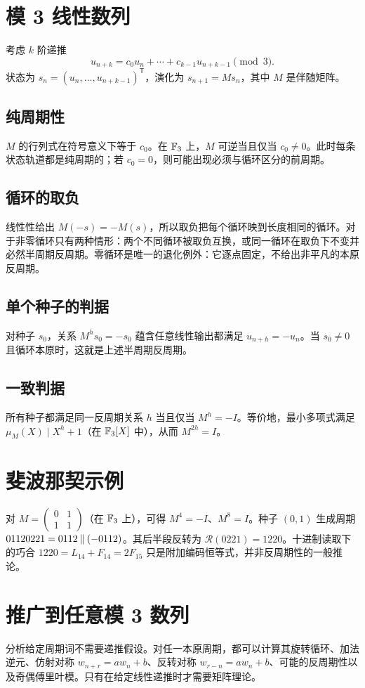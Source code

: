 \documentclass[11pt,a4paper]{article}
\begin{document}
\section{模 3 线性数列}
考虑 \(k\) 阶递推 \[u_{n+k}=c_0u_n+\cdots+c_{k-1}u_{n+k-1}\pmod3.\] 状态为 \(s_n=(u_n,\ldots,u_{n+k-1})^{\mathsf T}\)，演化为 \(s_{n+1}=Ms_n\)，其中 \(M\) 是伴随矩阵。
\subsection{纯周期性}
\(M\) 的行列式在符号意义下等于 \(c_0\)。在 \(\mathbb F_3\) 上，\(M\) 可逆当且仅当 \(c_0\neq0\)。此时每条状态轨道都是纯周期的；若 \(c_0=0\)，则可能出现必须与循环区分的前周期。
\subsection{循环的取负}
线性性给出 \(M(-s)=-M(s)\)，所以取负把每个循环映到长度相同的循环。对于非零循环只有两种情形：两个不同循环被取负互换，或同一循环在取负下不变并必然半周期反周期。零循环是唯一的退化例外：它逐点固定，不给出非平凡的本原反周期。
\subsection{单个种子的判据}
对种子 \(s_0\)，关系 \(M^hs_0=-s_0\) 蕴含任意线性输出都满足 \(u_{n+h}=-u_n\)。当 \(s_0\neq0\) 且循环本原时，这就是上述半周期反周期。
\subsection{一致判据}
所有种子都满足同一反周期关系 \(h\) 当且仅当 \(M^h=-I\)。等价地，最小多项式满足 \(\mu_M(X)\mid X^h+1\)（在 \(\mathbb F_3[X]\) 中），从而 \(M^{2h}=I\)。
\section{斐波那契示例}
对 \(M=\begin{pmatrix}0&1\\1&1\end{pmatrix}\)（在 \(\mathbb F_3\) 上），可得 \(M^4=-I\)、\(M^8=I\)。种子 \((0,1)\) 生成周期 \(01120221=0112\mathbin{\Vert}(-0112)\)。其后半段反转为 \(\mathcal R(0221)=1220\)。十进制读取下的巧合 \(1220=L_{14}+F_{14}=2F_{15}\) 只是附加编码恒等式，并非反周期性的一般推论。
\section{推广到任意模 3 数列}
分析给定周期词不需要递推假设。对任一本原周期，都可以计算其旋转循环、加法逆元、仿射对称 \(w_{n+r}=aw_n+b\)、反转对称 \(w_{r-n}=aw_n+b\)、可能的反周期性以及奇偶傅里叶模。只有在给定线性递推时才需要矩阵理论。
\end{document}

